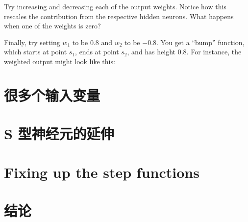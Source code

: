 Try increasing and decreasing each of the output weights. Notice how this
rescales the contribution from the respective hidden neurons. What happens when
one of the weights is zero?

Finally, try setting $w_1$ to be $0.8$ and $w_2$ to be $−0.8$. You get a
``bump'' function, which starts at point $s_1$, ends at point $s_2$, and has
height $0.8$. For instance, the weighted output might look like this:

\section{很多个输入变量}
\label{sec:many_input_variables}

\section{S 型神经元的延伸}
\label{sec:extension_beyond_sigmoid_neurons}

\section{Fixing up the step functions}
\label{sec:fixing_up_the_step_functions}

\section{结论}
\label{sec:conclusion}
